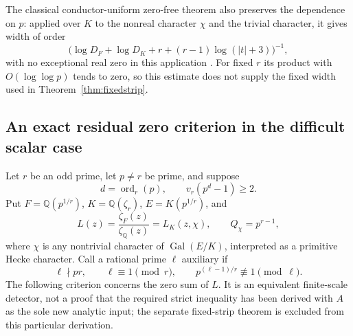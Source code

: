\documentclass[11pt]{article}
\theoremstyle{definition}
\theoremstyle{remark}
\begin{document}
The classical conductor-uniform zero-free theorem also preserves the dependence on $p$: applied over $K$ to the nonreal character $\chi$ and the trivial character, it gives width of order
\[
\bigl(\log D_F+\log D_K+r+(r-1)\log(|t|+3)\bigr)^{-1},
\]
with no exceptional real zero in this application
\citep[publisher online-first PDF, Appendix~A, Theorem~A.1, p.~12, and Remark~A.4, p.~13]{HumphriesBrumley2019}.
For fixed $r$ its product with $O(\log\log p)$ tends to zero, so this estimate does not supply the fixed width used in Theorem~\ref{thm:fixedstrip}.

\subsection{An exact residual zero criterion in the difficult scalar case}
\label{sec:kummer-residual-zero}

Let $r$ be an odd prime, let $p\ne r$ be prime, and suppose
\[
 d=\operatorname{ord}_r(p),\qquad v_r(p^d-1)\geq2.
\]
Put $F=\mathbb Q(p^{1/r})$, $K=\mathbb Q(\zeta_r)$,
$E=K(p^{1/r})$, and
\[
 L(z)=\frac{\zeta_F(z)}{\zeta_{\mathbb Q}(z)}=L_K(z,\chi),
 \qquad Q_\chi=p^{r-1},
\]
where $\chi$ is any nontrivial character of
$\operatorname{Gal}(E/K)$, interpreted as a primitive Hecke character.
Call a rational prime $\ell$ auxiliary if
\[
 \ell\nmid pr,\qquad \ell\equiv1\pmod r,
 \qquad p^{(\ell-1)/r}\not\equiv1\pmod\ell.
\]
The following criterion concerns the zero sum of $L$.
It is an equivalent finite-scale detector, not a proof that the
required strict inequality has been derived with $A$ as the sole
new analytic input; the separate fixed-strip theorem is excluded from
this particular derivation.
\end{document}
